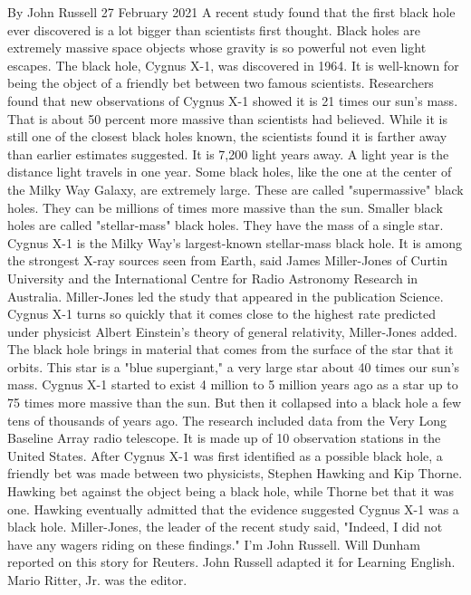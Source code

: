 By John Russell
27 February 2021
A recent study found that the first black hole ever discovered is a lot bigger than scientists first thought.
Black holes are extremely massive space objects whose gravity is so powerful not even light escapes. The black hole, Cygnus X-1, was discovered in 1964. It is well-known for being the object of a friendly bet between two famous scientists.
Researchers found that new observations of Cygnus X-1 showed it is 21 times our sun's mass. That is about 50 percent more massive than scientists had believed.
While it is still one of the closest black holes known, the scientists found it is farther away than earlier estimates suggested. It is 7,200 light years away. A light year is the distance light travels in one year.
Some black holes, like the one at the center of the Milky Way Galaxy, are extremely large. These are called "supermassive" black holes. They can be millions of times more massive than the sun. Smaller black holes are called "stellar-mass" black holes. They have the mass of a single star.
Cygnus X-1 is the Milky Way's largest-known stellar-mass black hole. It is among the strongest X-ray sources seen from Earth, said James Miller-Jones of Curtin University and the International Centre for Radio Astronomy Research in Australia. Miller-Jones led the study that appeared in the publication Science.
Cygnus X-1 turns so quickly that it comes close to the highest rate predicted under physicist Albert Einstein's theory of general relativity, Miller-Jones added.
The black hole brings in material that comes from the surface of the star that it orbits. This star is a "blue supergiant," a very large star about 40 times our sun's mass.
Cygnus X-1 started to exist 4 million to 5 million years ago as a star up to 75 times more massive than the sun. But then it collapsed into a black hole a few tens of thousands of years ago.
The research included data from the Very Long Baseline Array radio telescope. It is made up of 10 observation stations in the United States.
After Cygnus X-1 was first identified as a possible black hole, a friendly bet was made between two physicists, Stephen Hawking and Kip Thorne. Hawking bet against the object being a black hole, while Thorne bet that it was one. Hawking eventually admitted that the evidence suggested Cygnus X-1 was a black hole.
Miller-Jones, the leader of the recent study said, "Indeed, I did not have any wagers riding on these findings."
I'm John Russell.
Will Dunham reported on this story for Reuters. John Russell adapted it for Learning English. Mario Ritter, Jr. was the editor.

